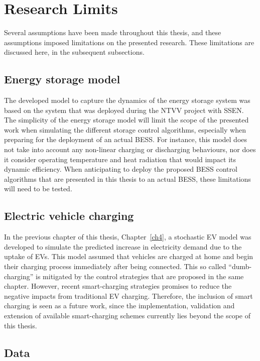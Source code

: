 \section{Research Limits}
\label{ch-conclusion:research-limits}

Several assumptions have been made throughout this thesis, and these assumptions imposed limitations on the presented research.
These limitations are discussed here, in the subsequent subsections.

\subsection{Energy storage model}

The developed model to capture the dynamics of the energy storage system was based on the system that was deployed during the NTVV project with SSEN.
The simplicity of the energy storage model will limit the scope of the presented work when simulating the different storage control algorithms, especially when preparing for the deployment of an actual BESS.
For instance, this model does not take into account any non-linear charging or discharging behaviours, nor does it consider operating temperature and heat radiation that would impact its dynamic efficiency.
When anticipating to deploy the proposed BESS control algorithms that are presented in this thesis to an actual BESS, these limitations will need to be tested.

\subsection{Electric vehicle charging}

In the previous chapter of this thesis, Chapter~\ref{ch4}, a stochastic EV model was developed to simulate the predicted increase in electricity demand due to the uptake of EVs.
This model assumed that vehicles are charged at home and begin their charging process immediately after being connected.
This so called ``dumb-charging'' is mitigated by the control strategies that are proposed in the same chapter.
However, recent smart-charging strategies promises to reduce the negative impacts from traditional EV charging.
Therefore, the inclusion of smart charging is seen as a future work, since the implementation, validation and extension of available smart-charging schemes currently lies beyond the scope of this thesis.

\subsection{Data}

